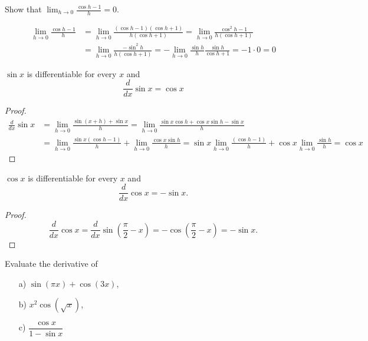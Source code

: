 \documentclass[../calc1-main.tex]{subfiles}
\begin{document}
  \begin{example}
    Show that $\lim_{h \to 0} \frac{\cos h - 1}{h} = 0$.
  \end{example}
  \begin{solution}
    \[
      \begin{split}
      \lim_{h \to 0} \frac{\cos h - 1}{h} & =
      \lim_{h \to 0} \frac{(\cos h - 1)(\cos h + 1)}{h(\cos h + 1)} =
      \lim_{h \to 0} \frac{\cos^2 h - 1}{h(\cos h + 1)} \\
      &= \lim_{h \to 0} \frac{-\sin^2 h}{h(\cos h + 1)}
      = -\lim_{h \to 0} \frac{\sin h}{h} \frac{\sin h}{\cos h + 1} = -1 \cdot 0 = 0
      \end{split}
    \]
  \end{solution}
  \begin{theorem}
    $\sin x$ is differentiable for every $x$ and
    \[
      \frac{d}{dx} \sin x = \cos x
    \]
  \end{theorem}
  \begin{proof}
    \[
      \begin{split}
        \frac{d}{dx} \sin x & =
        \lim_{h \to 0} \frac{\sin(x+h) + \sin x}{h} =
        \lim_{h \to 0} \frac{\sin x \cos h + \cos x \sin h - \sin x}{h}\\ &=
        \lim_{h \to 0} \frac{\sin x (\cos h-1)}{h} + \lim_{h \to 0} \frac{\cos x \sin h}{h} =
        \sin x \lim_{h \to 0} \frac{(\cos h-1)}{h} + \cos x \lim_{h \to 0} \frac{\sin h}{h} = \cos x
      \end{split}
    \]
  \end{proof}

  \begin{theorem}
    $\cos x$ is differentiable for every $x$ and
    \[
      \frac{d}{dx} \cos x = -\sin x.
    \]
  \end{theorem}
  \begin{proof}
    \[
      \frac{d}{dx} \cos x =
      \frac{d}{dx} \sin\left(\frac{\pi}{2} -x\right) =
      - \cos\left(\frac{\pi}{2} -x\right) = - \sin x.
    \]
  \end{proof}
  \begin{example}
    Evaluate the derivative of
    \begin{itemize}
      \item[a)] $\sin(\pi x) + \cos(3x)$,
      \item[b)] $x^2 \cos(\sqrt{x})$,
      \item[c)] $\dfrac{\cos x}{1- \sin x}$
    \end{itemize}
  \end{example}
\end{document}
